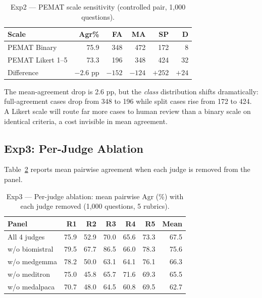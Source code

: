\documentclass[conference]{IEEEtran}
\begin{document}
\begin{table}[htbp]
\caption{Exp2 --- PEMAT scale sensitivity (controlled pair, 1,000
questions).}
\label{tab:exp2}
\begin{flushleft}
\small
\setlength{\tabcolsep}{4pt}
\begin{tabular}{|l|r|r|r|r|r|}
\hline
\textbf{Scale} & \textbf{Agr\%} & \textbf{FA} & \textbf{MA} & \textbf{SP} & \textbf{D} \\
\hline
PEMAT Binary      & 75.9 & 348 & 472 & 172 &  8 \\
PEMAT Likert 1--5 & 73.3 & 196 & 348 & 424 & 32 \\
\hline
Difference        & $-2.6$ pp & $-152$ & $-124$ & $+252$ & $+24$ \\
\hline
\end{tabular}
\end{flushleft}
\end{table}

The mean-agreement drop is 2.6 pp, but the \emph{class} distribution
shifts dramatically: full-agreement cases drop from 348 to 196 while
split cases rise from 172 to 424. A Likert scale will route far more
cases to human review than a binary scale on identical criteria, a
cost invisible in mean agreement.

\subsection{Exp3: Per-Judge Ablation}

Table~\ref{tab:exp3} reports mean pairwise agreement when each judge
is removed from the panel.

\begin{table}[htbp]
\caption{Exp3 --- Per-judge ablation: mean pairwise Agr (\%) with each
judge removed (1,000 questions, 5 rubrics).}
\label{tab:exp3}
\begin{flushleft}
\small
\setlength{\tabcolsep}{3pt}
\begin{tabular}{|l|r|r|r|r|r|r|}
\hline
\textbf{Panel} & \textbf{R1} & \textbf{R2} & \textbf{R3} & \textbf{R4} & \textbf{R5} & \textbf{Mean} \\
\hline
All 4 judges      & 75.9 & 52.9 & 70.0 & 65.6 & 73.3 & 67.5 \\
w/o biomistral    & 79.5 & 67.7 & 86.5 & 66.0 & 78.3 & 75.6 \\
w/o medgemma      & 78.2 & 50.0 & 63.1 & 64.1 & 76.1 & 66.3 \\
w/o meditron      & 75.0 & 45.8 & 65.7 & 71.6 & 69.3 & 65.5 \\
w/o medalpaca     & 70.7 & 48.0 & 64.5 & 60.8 & 69.5 & 62.7 \\
\hline
\end{tabular}
\end{flushleft}
\end{table}
\end{document}
